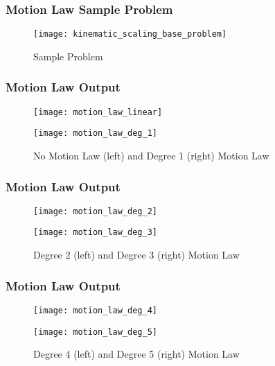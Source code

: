 \begin{frame}
	\frametitle{Motion Law Sample Problem}
	\begin{figure}
		\texttt{[image: kinematic\_scaling\_base\_problem]}
		\caption{Sample Problem}
	\end{figure}
\end{frame}

\begin{frame}
	\frametitle{Motion Law Output}
	\begin{figure}[hb]
		\centering
		\begin{minipage}{0.45\textwidth}
			\texttt{[image: motion\_law\_linear]}
		\end{minipage}%
		\begin{minipage}{0.45\textwidth}
			\texttt{[image: motion\_law\_deg\_1]}
		\end{minipage}
		\caption{No Motion Law (left) and Degree 1 (right) Motion Law}
		\label{fig:motion_law_lin_1}
	\end{figure}
\end{frame}
\begin{frame}
	\frametitle{Motion Law Output}

	\begin{figure}[hb]
		\centering
		\begin{minipage}{0.45\textwidth}
			\texttt{[image: motion\_law\_deg\_2]}
		\end{minipage}%
		\begin{minipage}{0.45\textwidth}
			\texttt{[image: motion\_law\_deg\_3]}
		\end{minipage}%
		\caption{Degree 2 (left) and Degree 3 (right) Motion Law}
		\label{fig:motion_law_2_3}
	\end{figure}
\end{frame}

\begin{frame}
	\frametitle{Motion Law Output}

	\begin{figure}[hb]
		\centering
		\begin{minipage}{0.45\textwidth}
			\texttt{[image: motion\_law\_deg\_4]}
		\end{minipage}%
		\begin{minipage}{0.45\textwidth}
			\texttt{[image: motion\_law\_deg\_5]}
		\end{minipage}%
		\caption{Degree 4 (left) and Degree 5 (right) Motion Law}
		\label{fig:motion_law_4_5}
	\end{figure}
\end{frame}

